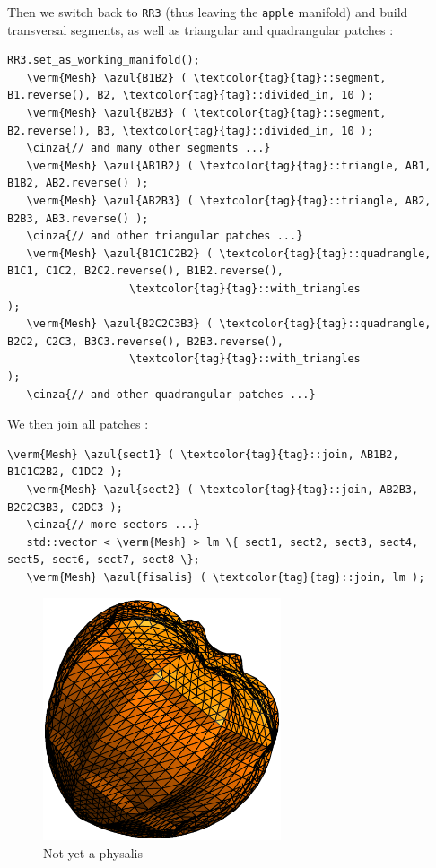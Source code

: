 Then we switch back to {\small\tt RR3} (thus leaving the {\small\tt apple} manifold) and build
transversal segments, as well as triangular and quadrangular patches :

\begin{Verbatim}[commandchars=\\\{\},formatcom=\small\tt,frame=single,
   label=parag-\ref{\numb section 2.\numb parag 11}.cpp,rulecolor=\color{coment},
   baselinestretch=0.94,framesep=2mm]
   RR3.set_as_working_manifold();
   \verm{Mesh} \azul{B1B2} ( \textcolor{tag}{tag}::segment, B1.reverse(), B2, \textcolor{tag}{tag}::divided_in, 10 );
   \verm{Mesh} \azul{B2B3} ( \textcolor{tag}{tag}::segment, B2.reverse(), B3, \textcolor{tag}{tag}::divided_in, 10 );
   \cinza{// and many other segments ...}
   \verm{Mesh} \azul{AB1B2} ( \textcolor{tag}{tag}::triangle, AB1, B1B2, AB2.reverse() );
   \verm{Mesh} \azul{AB2B3} ( \textcolor{tag}{tag}::triangle, AB2, B2B3, AB3.reverse() );
   \cinza{// and other triangular patches ...}
   \verm{Mesh} \azul{B1C1C2B2} ( \textcolor{tag}{tag}::quadrangle, B1C1, C1C2, B2C2.reverse(), B1B2.reverse(),
                   \textcolor{tag}{tag}::with_triangles                                           );
   \verm{Mesh} \azul{B2C2C3B3} ( \textcolor{tag}{tag}::quadrangle, B2C2, C2C3, B3C3.reverse(), B2B3.reverse(),
                   \textcolor{tag}{tag}::with_triangles                                           );
   \cinza{// and other quadrangular patches ...}   
\end{Verbatim}

We then join all patches :
\begin{Verbatim}[commandchars=\\\{\},formatcom=\small\tt,frame=single,
   label=parag-\ref{\numb section 2.\numb parag 11}.cpp,rulecolor=\color{coment},
   baselinestretch=0.94,framesep=2mm]
   \verm{Mesh} \azul{sect1} ( \textcolor{tag}{tag}::join, AB1B2, B1C1C2B2, C1DC2 );
   \verm{Mesh} \azul{sect2} ( \textcolor{tag}{tag}::join, AB2B3, B2C2C3B3, C2DC3 );
   \cinza{// more sectors ...}
   std::vector < \verm{Mesh} > lm \{ sect1, sect2, sect3, sect4, sect5, sect6, sect7, sect8 \};
   \verm{Mesh} \azul{fisalis} ( \textcolor{tag}{tag}::join, lm ); 
\end{Verbatim}

\begin{figure}[ht] \centering
  \includegraphics[width=70mm]{fisalis-round}
  \caption{Not yet a physalis}
  \label{\numb section 2.\numb fig 13}
\end{figure}

